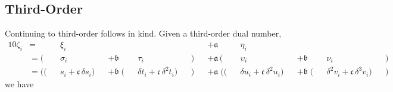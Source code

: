 \subsection*{Third-Order}

Continuing to third-order follows in kind.  Given a third-order dual number,
%
\begin{alignat*}{10}
\zeta_{i} 
&=
&& \xi_{i} && && &&
&&+ \mathfrak{a} \, 
&& \eta_{i} && && &&
\\
&=
( && \sigma_{i} && + \mathfrak{b} && \tau_{i} &&)
&&+ \mathfrak{a} \,
( && \upsilon_{i} && + \mathfrak{b} && \nu_{i} && )
\\
&=
(( && s_{i} + \mathfrak{c} \, \delta s_{i} )
&& + \mathfrak{b} \;
( && \delta t_{i} + \mathfrak{c} \, \delta^{2} t_{i}  ) &&)
&&+ \mathfrak{a} \;
(( && \delta u_{i} + \mathfrak{c} \, \delta^{2} u_{i} )
&& + \mathfrak{b} \;
( && \delta^{2} v_{i} + \mathfrak{c} \, \delta^{3} v_{i} ) &&)
\end{alignat*}
%
we have
%
